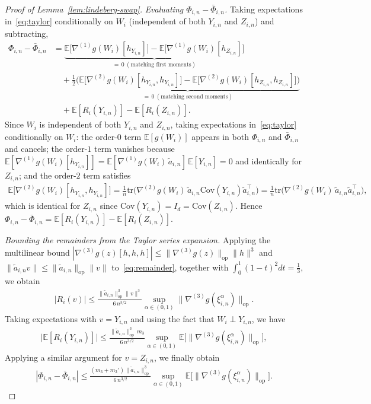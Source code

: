 \documentclass[12pt]{article}
\newcommand{\op}{\mathrm{op}}
\newcommand{\Ee}{{\mathbb{E}}}
\begin{document}
\begin{appendices}
\begin{proof}[Proof of Lemma~\ref{lem:lindeberg-swap}]
\medskip\noindent\textit{Evaluating $\Phi_{i,n}-\bar\Phi_{i,n}$.}
Taking expectations in~\eqref{eq:taylor} conditionally on $W_i$ (independent
of both $Y_{i,n}$ and $Z_{i,n}$) and subtracting,
\begin{align*}
  \Phi_{i,n}-\bar\Phi_{i,n}
  &=\underbrace{\Ee\big[\nabla^{(1)}g(W_i)[h_{Y_{i,n}}]\big]
               -\Ee\big[\nabla^{(1)}g(W_i)[h_{Z_{i,n}}]\big]}_{=\,0
               \ (\text{matching first moments})}\\
  &\quad
   +\tfrac12\underbrace{\Big(\Ee\big[\nabla^{(2)}g(W_i)[h_{Y_{i,n}},h_{Y_{i,n}}]\big]
               -\Ee\big[\nabla^{(2)}g(W_i)[h_{Z_{i,n}},h_{Z_{i,n}}]\big]\Big)}_{=\,0
               \ (\text{matching second moments})}\\
  &\quad
   +\Ee[R_i(Y_{i,n})]-\Ee[R_i(Z_{i,n})].
\end{align*}
Since $W_i$ is independent of both $Y_{i,n}$ and $Z_{i,n}$, taking
expectations in~\eqref{eq:taylor} conditionally on $W_i$:
the order-$0$ term $\Ee[g(W_i)]$ appears in both $\Phi_{i,n}$ and
$\bar\Phi_{i,n}$ and cancels; the order-$1$ term vanishes because
$\Ee[\nabla^{(1)}g(W_i)[h_{Y_{i,n}}]]
=\Ee[\nabla^{(1)}g(W_i)\,\widetilde a_{i,n}]\,\Ee[Y_{i,n}]=0$ and
identically for $Z_{i,n}$; and the order-$2$ term satisfies
\begin{align*}
  \Ee\big[\nabla^{(2)}g(W_i)[h_{Y_{i,n}},h_{Y_{i,n}}]\big]
  =\frac1n\mathrm{tr}\big(\nabla^{(2)}g(W_i)\,
    \widetilde a_{i,n}\mathrm{Cov}(Y_{i,n})\widetilde a_{i,n}^\top\big)
  =\frac1n\mathrm{tr}\big(\nabla^{(2)}g(W_i)\,
    \widetilde a_{i,n}\widetilde a_{i,n}^\top\big),
\end{align*}
which is identical for $Z_{i,n}$ since
$\mathrm{Cov}(Y_{i,n})=I_d=\mathrm{Cov}(Z_{i,n})$. Hence
$\Phi_{i,n}-\bar\Phi_{i,n}=\Ee[R_i(Y_{i,n})]-\Ee[R_i(Z_{i,n})]$.

\medskip\noindent\textit{Bounding the remainders from the Taylor series expansion.}
Applying the multilinear bound
$|\nabla^{(3)}g(z)[h,h,h]|\le\|\nabla^{(3)}g(z)\|_{\op}\|h\|^3$ and
$\|\widetilde a_{i,n}v\|\le\|\widetilde a_{i,n}\|_{\op}\|v\|$
to~\eqref{eq:remainder}, together with $\int_0^1(1-t)^2dt=\tfrac13$, we obtain
\begin{align*}
  |R_i(v)|
  \le\frac{\|\widetilde a_{i,n}\|_{\op}^3\|v\|^3}{6\,n^{3/2}}
     \sup_{\alpha\in(0,1)}\|\nabla^{(3)}g(\xi^\alpha_{i,n})\|_{\op}.
\end{align*}
Taking expectations with $v=Y_{i,n}$ and using the fact that
$W_i\perp Y_{i,n}$, we have
\begin{align}
  \label{eq:Ri-bound}
  \big|\Ee[R_i(Y_{i,n})]\big|
  \le\frac{\|\widetilde a_{i,n}\|_{\op}^3\,m_3}{6\,n^{3/2}}
     \sup_{\alpha\in(0,1)}\Ee\big[\|\nabla^{(3)}g(\xi^\alpha_{i,n})\|_{\op}\big],
\end{align}
Applying a similar argument for $v=Z_{i,n}$, we finally obtain
\begin{align*}
  |\Phi_{i,n}-\bar\Phi_{i,n}|
  \le\frac{(m_3+m_3')\|\widetilde a_{i,n}\|_{\op}^3}{6\,n^{3/2}}
     \sup_{\alpha\in(0,1)}\Ee\big[\|\nabla^{(3)}g(\xi^\alpha_{i,n})\|_{\op}\big].
\end{align*}


\end{proof}
\end{appendices}
\end{document}
